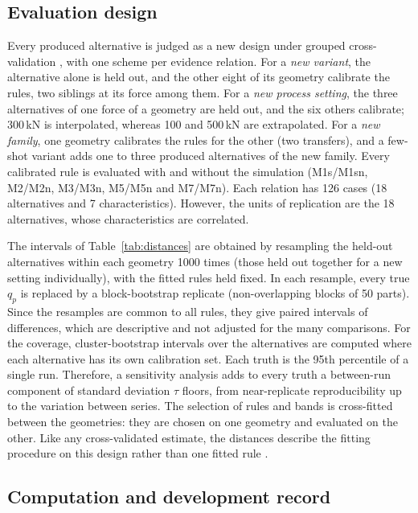 \documentclass[pdflatex,sn-basic,lineno]{sn-jnl}
\begin{document}
\subsection{Evaluation design}\label{sec:evaldesign}

Every produced alternative is judged as a new design under grouped cross-validation \citep{roberts2017cross}, with one scheme per evidence relation. For a \emph{new variant}, the alternative alone is held out, and the other eight of its geometry calibrate the rules, two siblings at its force among them. For a \emph{new process setting}, the three alternatives of one force of a geometry are held out, and the six others calibrate; 300\,kN is interpolated, whereas 100 and 500\,kN are extrapolated. For a \emph{new family}, one geometry calibrates the rules for the other (two transfers), and a few-shot variant adds one to three produced alternatives of the new family. Every calibrated rule is evaluated with and without the simulation (M1s/M1sn, M2/M2n, M3/M3n, M5/M5n and M7/M7n). Each relation has 126 cases (18 alternatives and 7 characteristics). However, the units of replication are the 18 alternatives, whose characteristics are correlated.

The intervals of Table~\ref{tab:distances} are obtained by resampling the held-out alternatives within each geometry 1000 times (those held out together for a new setting individually), with the fitted rules held fixed. In each resample, every true $q_p$ is replaced by a block-bootstrap replicate (non-overlapping blocks of 50 parts). Since the resamples are common to all rules, they give paired intervals of differences, which are descriptive and not adjusted for the many comparisons. For the coverage, cluster-bootstrap intervals over the alternatives are computed where each alternative has its own calibration set. Each truth is the 95th percentile of a single run. Therefore, a sensitivity analysis adds to every truth a between-run component of standard deviation $\tau$ floors, from near-replicate reproducibility up to the variation between series. The selection of rules and bands is cross-fitted between the geometries: they are chosen on one geometry and evaluated on the other. Like any cross-validated estimate, the distances describe the fitting procedure on this design rather than one fitted rule \citep{bates2024cross}.

\subsection{Computation and development record}\label{sec:computation}
\end{document}
